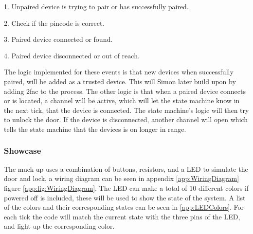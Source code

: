 1. Unpaired device is trying to pair or has successfully paired.

2. Check if the pincode is correct.

3. Paired device connected or found.

4. Paired device disconnected or out of reach.
\newline

The logic implemented for these events is that new devices when successfully paired, will be added as a trusted device.
This will Simon later build upon by adding 2fac to the process.
The other logic is that when a paired device connects or is located, a channel will be active, which will let the state machine know in the next tick, that the device is connected.
The state machine's logic will then try to unlock the door.
If the device is disconnected, another channel will open which tells the state machine that the devices is on longer in range.

\subsubsection{Showcase}
The muck-up uses a combination of buttons, resistors, and a LED to simulate the door and lock, a wiring diagram can be seen in appendix \ref{app:WiringDiagram} figure \ref{app:fig:WiringDiagram}.
The LED can make a total of 10 different colors if powered off is included,  these will be used to show the state of the system.
A list of the colors and their corresponding states can be seen in \ref{app:LEDColors}.
For each tick the code will match the current state with the three pins of the LED, and light up the corresponding color.